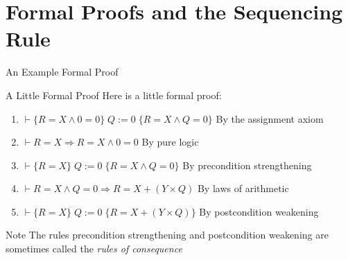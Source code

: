 \section{Formal Proofs and the Sequencing Rule}

\begin{frame}{An Example Formal Proof}
    \begin{block}{A Little Formal Proof}
        Here is a little formal proof:
    \end{block}
    
    \begin{enumerate}
        \item $\vdash \{R=X \wedge 0=0\} \; Q:=0 \; \{R=X \wedge Q=0\}$ \hfill By the assignment axiom
        \item $\vdash R=X \Rightarrow R=X \wedge 0=0$ \hfill By pure logic
        \item $\vdash \{R=X\} \; Q:=0 \; \{R=X \wedge Q=0\}$ \hfill By precondition strengthening
        \item $\vdash R=X \wedge Q=0 \Rightarrow R=X+(Y \times Q)$ \hfill By laws of arithmetic
        \item $\vdash \{R=X\} \; Q:=0 \; \{R=X+(Y \times Q)\}$ \hfill By postcondition weakening
    \end{enumerate}
    
    \begin{block}{Note}
        The rules precondition strengthening and postcondition weakening are sometimes called the \emph{rules of consequence}
    \end{block}
\end{frame}

